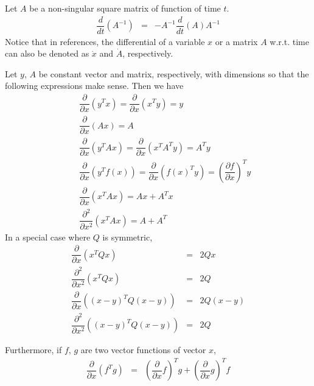 Let $A$ be a non-singular square matrix of function of time $t$.
\begin{eqnarray}
  \dfrac{d}{dt}\left(A^{-1}\right) &=& -A^{-1}\dfrac{d}{dt}\left(A\right)A^{-1} \nonumber
\end{eqnarray}  
Notice that in references, the differential of a variable $x$ or a matrix $A$ w.r.t. time can also be denoted as $\dot{x}$ and $\dot{A}$, respectively. 

Let $y$, $A$ be constant vector and matrix, respectively, with dimensions so that the following expressions make sense. Then we have
\begin{eqnarray}
  && \dfrac{\partial}{\partial x}\left(y^Tx\right) = \dfrac{\partial}{\partial x}\left(x^Ty\right) = y \nonumber \\
  && \dfrac{\partial}{\partial x}\left(Ax\right) = A \nonumber \\
  && \dfrac{\partial}{\partial x}\left(y^TAx\right) = \dfrac{\partial}{\partial x}\left(x^TA^Ty\right) = A^Ty \nonumber \\
  && \dfrac{\partial}{\partial x}\left(y^Tf(x)\right) = \dfrac{\partial}{\partial x}\left(f(x)^Ty\right) = \left(\dfrac{\partial f}{\partial x}\right)^Ty \nonumber \\
  && \dfrac{\partial}{\partial x}\left(x^TAx\right) = Ax + A^T x \nonumber \\
  && \dfrac{\partial^2}{\partial x^2}\left(x^TAx\right) = A + A^T \nonumber
\end{eqnarray}
In a special case where $Q$ is symmetric,
\begin{eqnarray}
  \dfrac{\partial}{\partial x}\left(x^TQx\right) &=& 2Qx \nonumber \\
  \dfrac{\partial^2}{\partial x^2}\left(x^TQx\right) &=& 2Q \nonumber \\
  \dfrac{\partial}{\partial x}\left((x-y)^TQ(x-y)\right) &=& 2Q(x-y) \nonumber \\
  \dfrac{\partial^2}{\partial x^2}\left((x-y)^TQ(x-y)\right) &=& 2Q \nonumber
\end{eqnarray}

Furthermore, if $f$, $g$ are two vector functions of vector $x$,
\begin{eqnarray}
  \dfrac{\partial}{\partial x}\left(f^Tg\right) &=& \left(\dfrac{\partial}{\partial x}f\right)^Tg + \left(\dfrac{\partial}{\partial x}g\right)^Tf \nonumber
\end{eqnarray}
